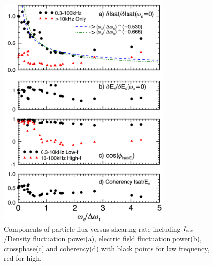 \documentclass[aps,prl,amsmath,amssymb,preprint,superscriptaddress]{revtex4}
\begin{document}
\begin{figure}[!htbp]
\centerline{
\includegraphics[width=8.5cm]{fluxcomps.pdf}}
\caption{\label{fig:fluxcomps} Components of particle flux versus shearing rate including $I_{\rm sat}$/Density fluctuation power(a), electric field fluctuation power(b), crossphase(c) and coherency(d) with black points for low frequency, red for high.}
\end{figure}


\end{document}
